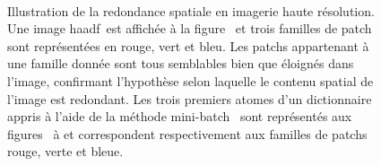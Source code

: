 \begin{figure}[t]
    \centering
    \\
    \hfill
    \hfill
    \caption{Illustration de la redondance spatiale en imagerie haute résolution. Une image \gls{haadf} est affichée à la figure~ et trois familles de patch sont représentées en rouge, vert et bleu. Les patchs appartenant à une famille donnée sont tous semblables bien que éloignés dans l'image, confirmant l'hypothèse selon laquelle le contenu spatial de l'image est redondant. Les trois premiers atomes d'un dictionnaire appris à l'aide de la méthode mini-batch~\cite{mairal2009online} sont représentés aux figures~ à  et correspondent respectivement aux familles de patchs rouge, verte et bleue.
        \protect\label{fig-redondance-spatiale}}
\end{figure}


